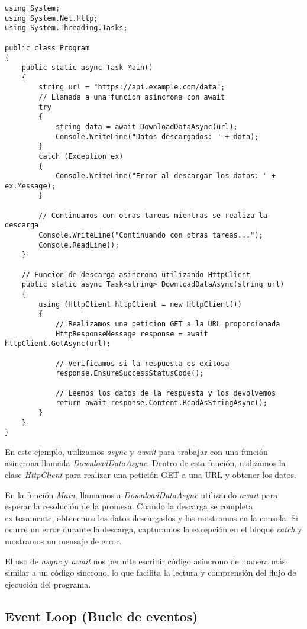 \documentclass[executivepaper]{article}
\begin{document}
\begin{lstlisting}
using System;
using System.Net.Http;
using System.Threading.Tasks;

public class Program
{
    public static async Task Main()
    {
        string url = "https://api.example.com/data";
        // Llamada a una funcion asincrona con await
        try
        {
            string data = await DownloadDataAsync(url);
            Console.WriteLine("Datos descargados: " + data);
        }
        catch (Exception ex)
        {
            Console.WriteLine("Error al descargar los datos: " + ex.Message);
        }
    
        // Continuamos con otras tareas mientras se realiza la descarga
        Console.WriteLine("Continuando con otras tareas...");
        Console.ReadLine();
    }
    
    // Funcion de descarga asincrona utilizando HttpClient
    public static async Task<string> DownloadDataAsync(string url)
    {
        using (HttpClient httpClient = new HttpClient())
        {
            // Realizamos una peticion GET a la URL proporcionada
            HttpResponseMessage response = await httpClient.GetAsync(url);
    
            // Verificamos si la respuesta es exitosa
            response.EnsureSuccessStatusCode();
    
            // Leemos los datos de la respuesta y los devolvemos
            return await response.Content.ReadAsStringAsync();
        }
    }
}
\end{lstlisting}

En este ejemplo, utilizamos \emph{async} y \emph{await} para trabajar con una función asíncrona llamada \emph{DownloadDataAsync}. Dentro de esta función, utilizamos la clase \emph{HttpClient} para realizar una petición GET a una URL y obtener los datos.

En la función \emph{Main}, llamamos a \emph{DownloadDataAsync} utilizando \emph{await} para esperar la resolución de la promesa. Cuando la descarga se completa exitosamente, obtenemos los datos descargados y los mostramos en la consola. Si ocurre un error durante la descarga, capturamos la excepción en el bloque \emph{catch} y mostramos un mensaje de error.

El uso de \emph{async} y \emph{await} nos permite escribir código asíncrono de manera más similar a un código síncrono, lo que facilita la lectura y comprensión del flujo de ejecución del programa.

\subsection{Event Loop (Bucle de eventos)}
\end{document}
